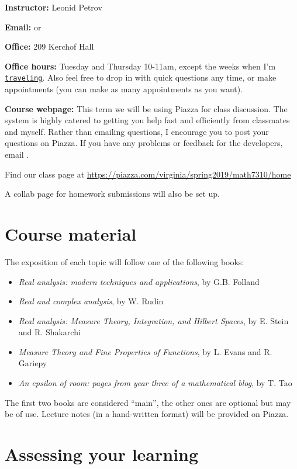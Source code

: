 \documentclass[oneside,11pt]{amsart}
\begin{document}
\medskip

\textbf{Instructor:} Leonid Petrov
\medskip

\textbf{Email:}  or 
\medskip

\textbf{Office:} 209 Kerchof Hall
\medskip

\textbf{Office hours:} 
Tuesday and Thursday 10-11am, except the weeks when I'm \href{https://lpetrov.cc/2018/05/travel-2019/}{\texttt{traveling}}.
Also feel free to drop in with quick questions any time, or make 
appointments 
(you can make as many appointments as you want).

\medskip

\textbf{Course webpage:} 
This term we will be using Piazza for class discussion. The system is highly catered to getting you help fast and efficiently from classmates and myself. Rather than emailing questions, I encourage you to post your questions on Piazza. If you have any problems or feedback for the developers, email .

Find our class page at \url{https://piazza.com/virginia/spring2019/math7310/home}

A collab page for homework submissions will also be set up.

\section{Course material}

The exposition of each topic will follow one
of the following books:
\begin{itemize}
	\item \emph{Real analysis: modern techniques and applications}, by G.B. Folland
	\item \emph{Real and complex analysis}, by W. Rudin
	\item \emph{Real analysis: Measure Theory, Integration, and Hilbert Spaces},
		by E. Stein and R. Shakarchi
	\item \emph{Measure Theory and Fine Properties of Functions},
		by L. Evans and R. Gariepy
	\item \emph{An epsilon of room: pages from year three of a mathematical blog},
		by T. Tao
\end{itemize}
The first two books are considered ``main'', 
the other ones are optional but may be of use.
Lecture notes (in a hand-written format)
will be provided on Piazza. 

\section{Assessing your learning}
\end{document}
